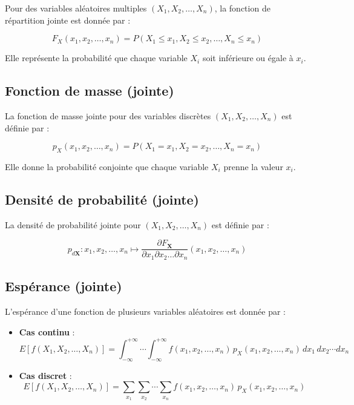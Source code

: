 \documentclass{article}
\begin{document}
Pour des variables aléatoires multiples $(X_1, X_2, \dotsc, X_n)$, la fonction de répartition jointe est donnée par :

\[
F_{X}(x_1, x_2, \dotsc, x_n) = P(X_1 \leq x_1, X_2 \leq x_2, \dotsc, X_n \leq x_n)
\]

Elle représente la probabilité que chaque variable $X_i$ soit inférieure ou égale à $x_i$.

\subsection{Fonction de masse (jointe)}

La fonction de masse jointe pour des variables discrètes $(X_1, X_2, \dotsc, X_n)$ est définie par :

\[
p_{X}(x_1, x_2, \dotsc, x_n) = P(X_1 = x_1, X_2 = x_2, \dotsc, X_n = x_n)
\]

Elle donne la probabilité conjointe que chaque variable $X_i$ prenne la valeur $x_i$.

\subsection{Densité de probabilité (jointe)}

La densité de probabilité jointe pour $(X_1, X_2, \dotsc, X_n)$ est définie par :

\[
p_{d\mathbf{X}}: x_1, x_2, \dotsc, x_n \mapsto \frac{\partial F_{\mathbf{X}}}{\partial x_1 \partial x_2 \dots \partial x_n}(x_1, x_2, \dotsc, x_n)
\]

\subsection{Espérance (jointe)}

L'espérance d'une fonction de plusieurs variables aléatoires est donnée par :

\begin{itemize}
    \item \textbf{Cas continu} :
    \[
    E[f(X_1, X_2, \dotsc, X_n)] = \int_{-\infty}^{+\infty} \dotsb \int_{-\infty}^{+\infty} f(x_1, x_2, \dotsc, x_n) \, p_{X}(x_1, x_2, \dotsc, x_n) \, dx_1 \, dx_2 \dotsb dx_n
    \]
    
    \item \textbf{Cas discret} :
    \[
    E[f(X_1, X_2, \dotsc, X_n)] = \sum_{x_1} \sum_{x_2} \dotsb \sum_{x_n} f(x_1, x_2, \dotsc, x_n) \, p_{X}(x_1, x_2, \dotsc, x_n)
    \]
\end{itemize}
\end{document}
